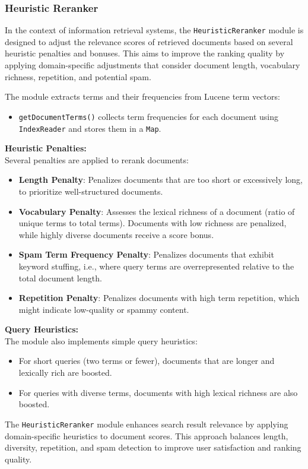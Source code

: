 \subsubsection{Heuristic Reranker}


In the context of information retrieval systems, the \texttt{HeuristicReranker} module is designed to adjust the relevance scores of retrieved documents based on several heuristic penalties and bonuses. This aims to improve the ranking quality by applying domain-specific adjustments that consider document length, vocabulary richness, repetition, and potential spam.


The module extracts terms and their frequencies from Lucene term vectors:
\begin{itemize}
    \item \texttt{getDocumentTerms()} collects term frequencies for each document using \texttt{IndexReader} and stores them in a \texttt{Map}.
\end{itemize}

\noindent\textbf{\large Heuristic Penalties:} \\
Several penalties are applied to rerank documents:

\begin{itemize}
    \item \textbf{Length Penalty}: Penalizes documents that are too short or excessively long, to prioritize well-structured documents.
    \item \textbf{Vocabulary Penalty}: Assesses the lexical richness of a document (ratio of unique terms to total terms). Documents with low richness are penalized, while highly diverse documents receive a score bonus.
    \item \textbf{Spam Term Frequency Penalty}: Penalizes documents that exhibit keyword stuffing, i.e., where query terms are overrepresented relative to the total document length.
    \item \textbf{Repetition Penalty}: Penalizes documents with high term repetition, which might indicate low-quality or spammy content.
\end{itemize}

\noindent\textbf{\large Query Heuristics:} \\
The module also implements simple query heuristics:
\begin{itemize}
    \item For short queries (two terms or fewer), documents that are longer and lexically rich are boosted.
    \item For queries with diverse terms, documents with high lexical richness are also boosted.
\end{itemize}


The \texttt{HeuristicReranker} module enhances search result relevance by applying domain-specific heuristics to document scores. This approach balances length, diversity, repetition, and spam detection to improve user satisfaction and ranking quality.
